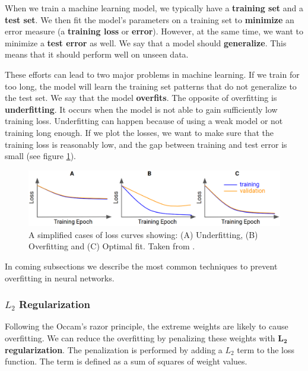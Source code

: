 When we train a machine learning model, we typically have a
\textbf{training set} and a \textbf{test set}. We then fit the model's
parameters on a training set to \textbf{minimize} an error measure
(a \textbf{training loss} or \textbf{error}). However, at the same time, we want
to minimize a \textbf{test error} as well. We say that a model should
\textbf{generalize}. This means that it should perform well on unseen data.

These efforts can lead to two major problems in machine learning. If we train
for too long, the model will learn the training set patterns that do not
generalize to the test set. We say that the model \textbf{overfits}. The
opposite of overfitting is \textbf{underfitting}. It occurs when the model is
not able to gain sufficiently low training loss. Underfitting can happen because
of using a weak model or not training long enough. If we plot the losses, we
want to make sure that the training loss is reasonably low, and the gap between
training and test error is small (see figure \ref{fig:loss_plot}).

\begin{figure}[h]
    \centering
    \includegraphics[width=\linewidth]{Sources/Figures/fitting.png}
    \caption{A simplified cases of loss curves \protect\footnotemark showing:
        (A) Underfitting, (B) Overfitting and (C) Optimal fit. Taken from
        \cite{bileschi2020deep}.}
    \label{fig:loss_plot}
\end{figure}


In coming subsections we describe the most common techniques to prevent
overfitting in neural networks.
\subsubsection{$L_2$ Regularization}
Following the Occam's razor principle\footnotemark , the extreme weights are
likely to cause overfitting. We can reduce the overfitting by penalizing these
weights with $\boldsymbol{L_2}$ \textbf{regularization}. The penalization is
performed by adding a $L_2$ term to the loss function. The term is defined as a
sum of squares of weight values.



